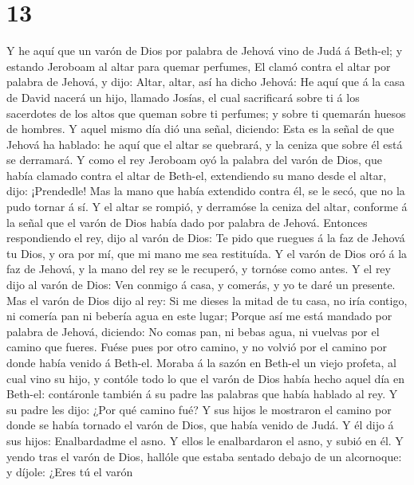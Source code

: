 \hypertarget{section-12}{%
\section{13}\label{section-12}}

 Y he aquí que un varón de Dios por palabra de Jehová vino
de Judá á Beth-el; y estando Jeroboam al altar para quemar perfumes,
 El clamó contra el altar por palabra de Jehová, y dijo:
Altar, altar, así ha dicho Jehová: He aquí que á la casa de David nacerá
un hijo, llamado Josías, el cual sacrificará sobre ti á los sacerdotes
de los altos que queman sobre ti perfumes; y sobre ti quemarán huesos de
hombres.  Y aquel mismo día dió una señal, diciendo: Esta
es la señal de que Jehová ha hablado: he aquí que el altar se quebrará,
y la ceniza que sobre él está se derramará.  Y como el rey
Jeroboam oyó la palabra del varón de Dios, que había clamado contra el
altar de Beth-el, extendiendo su mano desde el altar, dijo: ¡Prendedle!
Mas la mano que había extendido contra él, se le secó, que no la pudo
tornar á sí.  Y el altar se rompió, y derramóse la ceniza
del altar, conforme á la señal que el varón de Dios había dado por
palabra de Jehová.  Entonces respondiendo el rey, dijo al
varón de Dios: Te pido que ruegues á la faz de Jehová tu Dios, y ora por
mí, que mi mano me sea restituída. Y el varón de Dios oró á la faz de
Jehová, y la mano del rey se le recuperó, y tornóse como antes.
 Y el rey dijo al varón de Dios: Ven conmigo á casa, y
comerás, y yo te daré un presente.  Mas el varón de Dios
dijo al rey: Si me dieses la mitad de tu casa, no iría contigo, ni
comería pan ni bebería agua en este lugar;  Porque así me
está mandado por palabra de Jehová, diciendo: No comas pan, ni bebas
agua, ni vuelvas por el camino que fueres.  Fuése pues
por otro camino, y no volvió por el camino por donde había venido á
Beth-el.  Moraba á la sazón en Beth-el un viejo profeta,
al cual vino su hijo, y contóle todo lo que el varón de Dios había hecho
aquel día en Beth-el: contáronle también á su padre las palabras que
había hablado al rey.  Y su padre les dijo: ¿Por qué
camino fué? Y sus hijos le mostraron el camino por donde se había
tornado el varón de Dios, que había venido de Judá.  Y él
dijo á sus hijos: Enalbardadme el asno. Y ellos le enalbardaron el asno,
y subió en él.  Y yendo tras el varón de Dios, hallóle
que estaba sentado debajo de un alcornoque: y díjole: ¿Eres tú el varón
